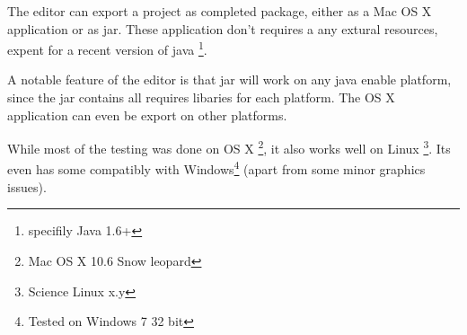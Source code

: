 The editor can export a project as completed  package, either as a Mac OS X application or as jar. These application don't requires a any extural resources, expent for a recent version of java \footnote{specifily Java 1.6+}.

A notable feature of the editor is that jar will work on any java enable platform, since the jar contains all requires libaries for each platform. The OS X application can even be export on other platforms.

While most of the testing was done on OS X \footnote{Mac OS X  10.6 Snow leopard}, it also works well on Linux \footnote{Science  Linux x.y}. Its even has some  compatibly with Windows\footnote{Tested on Windows 7 32 bit} (apart from some minor graphics issues).